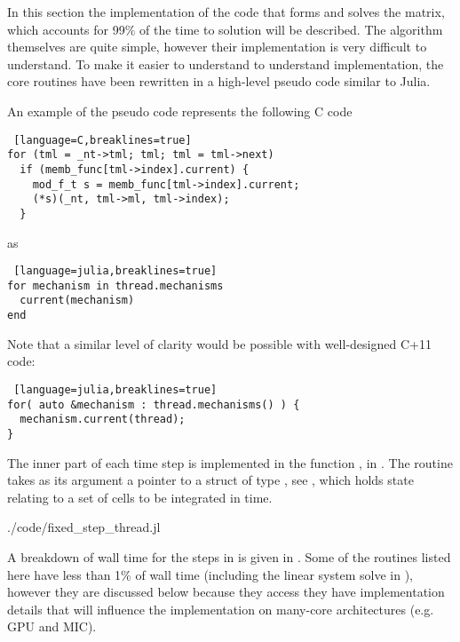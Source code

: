 In this section the implementation of the code that forms and solves the matrix, which accounts for 99\% of the time to solution will be described. The algorithm themselves are quite simple, however their implementation is very difficult to understand. To make it easier to understand to understand implementation, the core routines have been rewritten in a high-level pseudo code similar to Julia.

An example of the pseudo code represents the following C code
\begin{shaded}
\begin{lstlisting} [language=C,breaklines=true]
for (tml = _nt->tml; tml; tml = tml->next)
  if (memb_func[tml->index].current) {
    mod_f_t s = memb_func[tml->index].current;
    (*s)(_nt, tml->ml, tml->index);
  }
\end{lstlisting}
\end{shaded}
\noindent as
\begin{shaded}
\begin{lstlisting} [language=julia,breaklines=true]
for mechanism in thread.mechanisms
  current(mechanism)
end
\end{lstlisting}
\end{shaded}
\noindent Note that a similar level of clarity would be possible with well-designed C+11 code:
\begin{shaded}
\begin{lstlisting} [language=julia,breaklines=true]
for( auto &mechanism : thread.mechanisms() ) {
  mechanism.current(thread);
}
\end{lstlisting}
\end{shaded}

The inner part of each time step is implemented in the function , in . The routine takes as its argument a pointer to a struct of type , see , which holds state relating to a set of cells to be integrated in time.
\begin{shaded}
 {./code/fixed_step_thread.jl}
\end{shaded}

A breakdown of wall time for the steps in  is given in . Some of the routines listed here have less than 1\% of wall time (including the linear system solve in ), however they are discussed below because they access they have implementation details that will influence the implementation on many-core architectures (e.g. GPU and MIC).

